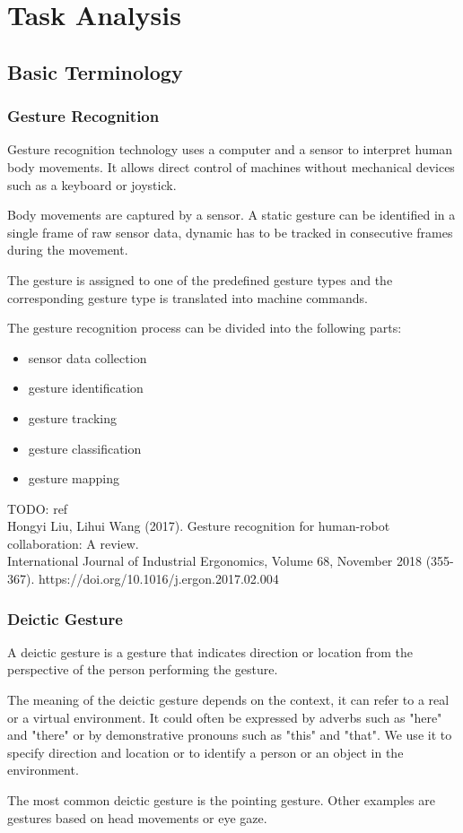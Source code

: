 \chapter{Task Analysis}


\section{Basic Terminology}

\subsection{Gesture Recognition}
Gesture recognition technology uses a computer and a sensor to interpret human body movements. It allows direct control of machines without mechanical devices such as a keyboard or joystick.\par
Body movements are captured by a sensor. A static gesture can be identified in a single frame of raw sensor data, dynamic has to be tracked in consecutive frames during the movement.\par
The gesture is assigned to one of the predefined gesture types and the corresponding gesture type is translated into machine commands.\par
The gesture recognition process can be divided into the following parts:\par
\begin{itemize}
	\item sensor data collection
    \item gesture identification
    \item gesture tracking
    \item gesture classification
    \item gesture mapping
\end{itemize}

TODO: ref \\
Hongyi Liu, Lihui Wang (2017). Gesture recognition for human-robot collaboration: A review.\\
International Journal of Industrial Ergonomics, Volume 68, November 2018 (355-367).
https://doi.org/10.1016/j.ergon.2017.02.004\\

\subsection{Deictic Gesture}
A deictic gesture is a gesture that indicates direction or location from the perspective of the person performing the gesture.\par
The meaning of the deictic gesture depends on the context, it can refer to a real or a virtual environment. It could often be expressed by adverbs such as "here" and "there" or by demonstrative pronouns such as "this" and "that". We use it to specify direction and location or to identify a person or an object in the environment.\par
The most common deictic gesture is the pointing gesture. Other examples are
gestures based on head movements or eye gaze.\par

